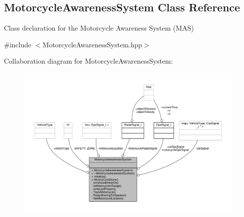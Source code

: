 \hypertarget{classMotorcycleAwarenessSystem}{\subsection{Motorcycle\-Awareness\-System Class Reference}
\label{classMotorcycleAwarenessSystem}
}


Class declaration for the Motorcycle Awareness System (M\-A\-S)  




{\ttfamily \#include $<$Motorcycle\-Awareness\-System.\-hpp$>$}



Collaboration diagram for Motorcycle\-Awareness\-System\-:\nopagebreak
\begin{figure}[H]
\begin{center}
\leavevmode
\includegraphics[width=350pt]{classMotorcycleAwarenessSystem__coll__graph}
\end{center}
\end{figure}
